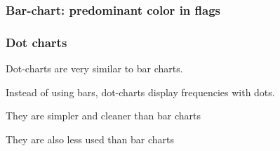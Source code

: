 \documentclass[12pt]{beamer}\usepackage[]{graphicx}\usepackage[]{color}
\makeatletter
\newenvironment{kframe}{%
 \def\at@end@of@kframe{}%
 \ifinner\ifhmode%
  \def\at@end@of@kframe{\end{minipage}}%
  \begin{minipage}{\columnwidth}%
 \fi\fi%
 \def\FrameCommand##1{\hskip\@totalleftmargin \hskip-\fboxsep
 \colorbox{shadecolor}{##1}\hskip-\fboxsep
     \hskip-\linewidth \hskip-\@totalleftmargin \hskip\columnwidth}%
 \MakeFramed {\advance\hsize-\width
   \@totalleftmargin\z@ \linewidth\hsize
   \@setminipage}}%
 {\par\unskip\endMakeFramed%
 \at@end@of@kframe}
\newenvironment{knitrout}{}{} %
\makeatother
\begin{document}
\begin{frame}[fragile]
\frametitle{Bar-chart: predominant color in flags}

\begin{knitrout}\footnotesize
{}\color{fgcolor}\begin{kframe}


{\ttfamily\noindent\bfseries\color{errorcolor}{\#\# Error in sort(hues, decreasing = TRUE): object 'hues' not found}}

{\ttfamily\noindent\bfseries\color{errorcolor}{\#\# Error in axis(side = 1, at = seq(0, 75, 10)): plot.new has not been called yet}}

{\ttfamily\noindent\bfseries\color{errorcolor}{\#\# Error in as.vector(hues): object 'hues' not found}}\end{kframe}
\end{knitrout}

\end{frame}


\begin{frame}
\begin{center}
\Huge{}
\end{center}
\end{frame}


\begin{frame}
\frametitle{Dot charts}
\bbi
  \item Dot-charts are very similar to bar charts.
  \item Instead of using bars, dot-charts display frequencies with dots.
  \item They are simpler and cleaner than bar charts
  \item They are also less used than bar charts
\ei
\end{frame}

\end{document}
